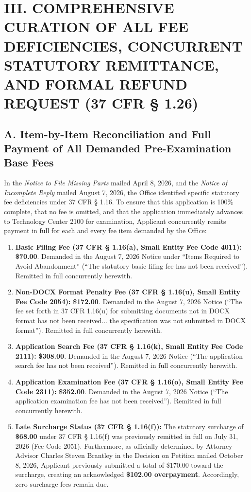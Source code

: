 \documentclass[11pt,letterpaper]{article}
\begin{document}
\section*{III. COMPREHENSIVE CURATION OF ALL FEE DEFICIENCIES, CONCURRENT STATUTORY REMITTANCE, AND FORMAL REFUND REQUEST (37 CFR \S{} 1.26)}

\subsection*{A. Item-by-Item Reconciliation and Full Payment of All Demanded Pre-Examination Base Fees}
In the \textit{Notice to File Missing Parts} mailed April 8, 2026, and the \textit{Notice of Incomplete Reply} mailed August 7, 2026, the Office identified specific statutory fee deficiencies under 37 CFR \S{} 1.16. To ensure that this application is 100\% complete, that no fee is omitted, and that the application immediately advances to Technology Center 2100 for examination, Applicant concurrently remits payment in full for each and every fee item demanded by the Office:

\begin{enumerate}[leftmargin=*]
    \item \textbf{Basic Filing Fee (37 CFR \S{} 1.16(a), Small Entity Fee Code 4011):} \textbf{\$70.00}. Demanded in the August 7, 2026 Notice under ``Items Required to Avoid Abandonment'' (``The statutory basic filing fee has not been received''). Remitted in full concurrently herewith.
    
    \item \textbf{Non-DOCX Format Penalty Fee (37 CFR \S{} 1.16(u), Small Entity Fee Code 2054):} \textbf{\$172.00}. Demanded in the August 7, 2026 Notice (``The fee set forth in 37 CFR 1.16(u) for submitting documents not in DOCX format has not been received... the specification was not submitted in DOCX format''). Remitted in full concurrently herewith.
    
    \item \textbf{Application Search Fee (37 CFR \S{} 1.16(k), Small Entity Fee Code 2111):} \textbf{\$308.00}. Demanded in the August 7, 2026 Notice (``The application search fee has not been received''). Remitted in full concurrently herewith.
    
    \item \textbf{Application Examination Fee (37 CFR \S{} 1.16(o), Small Entity Fee Code 2311):} \textbf{\$352.00}. Demanded in the August 7, 2026 Notice (``The application examination fee has not been received''). Remitted in full concurrently herewith.

    \item \textbf{Late Surcharge Status (37 CFR \S{} 1.16(f)):} The statutory surcharge of \textbf{\$68.00} under 37 CFR \S{} 1.16(f) was previously remitted in full on July 31, 2026 (Fee Code 2051). Furthermore, as officially determined by Attorney Advisor Charles Steven Brantley in the Decision on Petition mailed October 8, 2026, Applicant previously submitted a total of \$170.00 toward the surcharge, creating an acknowledged \textbf{\$102.00 overpayment}. Accordingly, zero surcharge fees remain due.
\end{enumerate}
\end{document}
